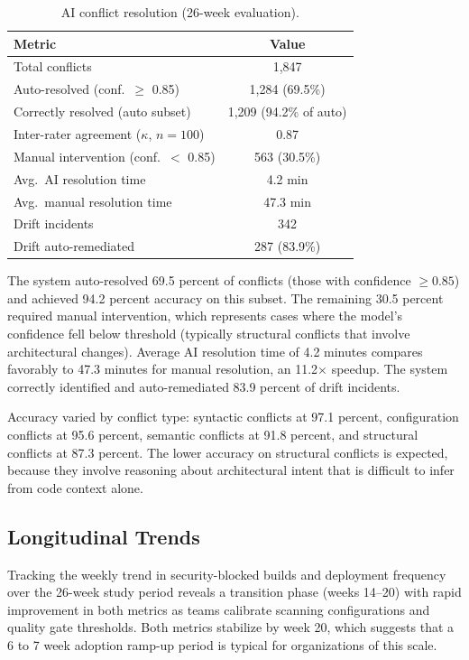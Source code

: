 \documentclass{ieeeaccess}
\begin{document}
\begin{table}[!t]
\caption{AI conflict resolution (26-week evaluation).}
\label{tab:ai}
\centering
\begin{tabular}{lc}
\hline
\textbf{Metric} & \textbf{Value} \\
\hline
Total conflicts                       & 1{,}847        \\
Auto-resolved (conf.\ $\geq$ 0.85)    & 1{,}284 (69.5\%) \\
Correctly resolved (auto subset)      & 1{,}209 (94.2\% of auto) \\
Inter-rater agreement ($\kappa$, $n=100$) & 0.87       \\
Manual intervention (conf.\ $<$ 0.85)  & 563 (30.5\%)   \\
Avg.\ AI resolution time              & 4.2 min        \\
Avg.\ manual resolution time          & 47.3 min       \\
Drift incidents                       & 342            \\
Drift auto-remediated                 & 287 (83.9\%)   \\
\hline
\end{tabular}
\end{table}

The system auto-resolved 69.5 percent of conflicts (those with confidence $\geq 0.85$) and achieved 94.2 percent accuracy on this subset. The remaining 30.5 percent required manual intervention, which represents cases where the model's confidence fell below threshold (typically structural conflicts that involve architectural changes). Average AI resolution time of 4.2 minutes compares favorably to 47.3 minutes for manual resolution, an 11.2$\times$ speedup. The system correctly identified and auto-remediated 83.9 percent of drift incidents.

Accuracy varied by conflict type: syntactic conflicts at 97.1 percent, configuration conflicts at 95.6 percent, semantic conflicts at 91.8 percent, and structural conflicts at 87.3 percent. The lower accuracy on structural conflicts is expected, because they involve reasoning about architectural intent that is difficult to infer from code context alone.

\subsection{Longitudinal Trends}
Tracking the weekly trend in security-blocked builds and deployment frequency over the 26-week study period reveals a transition phase (weeks 14--20) with rapid improvement in both metrics as teams calibrate scanning configurations and quality gate thresholds. Both metrics stabilize by week 20, which suggests that a 6 to 7 week adoption ramp-up period is typical for organizations of this scale.
\end{document}
